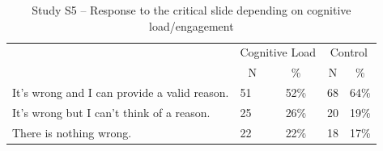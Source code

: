 \documentclass[
  man,floatsintext]{apa6}
\begin{document}
\begin{table}[tbp]

\begin{center}
\begin{threeparttable}

\caption{\label{tab:tabS5tab1dumb1all}Study S5 – Response to the critical slide depending on cognitive load/engagement}

\begin{tabular}{llccc}
\toprule
 & \multicolumn{2}{c}{Cognitive Load} & \multicolumn{2}{c}{Control} \\
\cmidrule(r){2-3} \cmidrule(r){4-5}
 & \multicolumn{1}{c}{N} & \multicolumn{1}{c}{\%} & \multicolumn{1}{c}{N} & \multicolumn{1}{c}{\%}\\
\midrule
It's wrong and I can provide a valid reason. & 51 & 52\% & 68 & 64\%\\
It's wrong but I can't think of a reason. & 25 & 26\% & 20 & 19\%\\
There is nothing wrong. & 22 & 22\% & 18 & 17\%\\
\bottomrule
\end{tabular}

\end{threeparttable}
\end{center}

\end{table}
\end{document}
